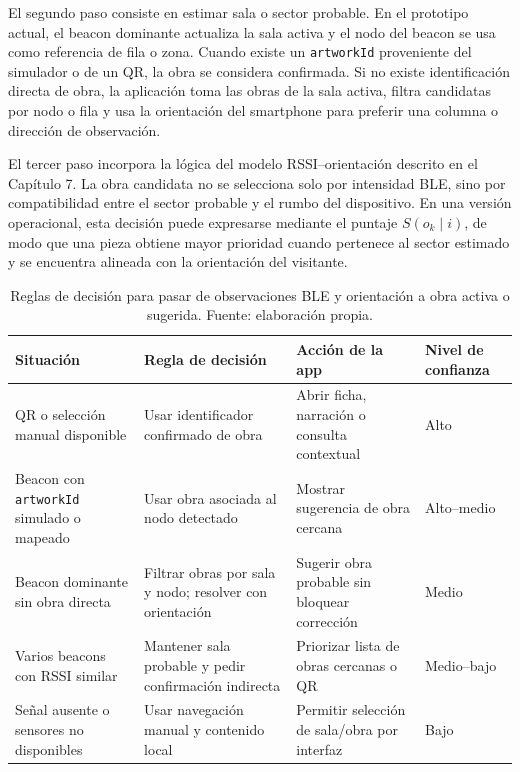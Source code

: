 El segundo paso consiste en estimar sala o sector probable. En el prototipo actual, el beacon dominante actualiza la sala activa y el nodo del beacon se usa como referencia de fila o zona. Cuando existe un \texttt{artworkId} proveniente del simulador o de un QR, la obra se considera confirmada. Si no existe identificaci\'on directa de obra, la aplicaci\'on toma las obras de la sala activa, filtra candidatas por nodo o fila y usa la orientaci\'on del smartphone para preferir una columna o direcci\'on de observaci\'on.

El tercer paso incorpora la l\'ogica del modelo RSSI--orientaci\'on descrito en el Cap\'itulo 7. La obra candidata no se selecciona solo por intensidad BLE, sino por compatibilidad entre el sector probable y el rumbo del dispositivo. En una versi\'on operacional, esta decisi\'on puede expresarse mediante el puntaje \(S(o_k \mid i)\), de modo que una pieza obtiene mayor prioridad cuando pertenece al sector estimado y se encuentra alineada con la orientaci\'on del visitante.

\begin{table}[h!]
    \centering
    \footnotesize
    \setlength{\tabcolsep}{4pt}
    \begin{tabular}{>{\raggedright\arraybackslash}p{3.2cm} >{\raggedright\arraybackslash}p{4.5cm} >{\raggedright\arraybackslash}p{4.2cm} >{\raggedright\arraybackslash}p{3.2cm}}
        \hline
        \textbf{Situaci\'on} & \textbf{Regla de decisi\'on} & \textbf{Acci\'on de la app} & \textbf{Nivel de confianza} \\
        \hline
        QR o selecci\'on manual disponible & Usar identificador confirmado de obra & Abrir ficha, narraci\'on o consulta contextual & Alto \\
        Beacon con \texttt{artworkId} simulado o mapeado & Usar obra asociada al nodo detectado & Mostrar sugerencia de obra cercana & Alto--medio \\
        Beacon dominante sin obra directa & Filtrar obras por sala y nodo; resolver con orientaci\'on & Sugerir obra probable sin bloquear correcci\'on & Medio \\
        Varios beacons con RSSI similar & Mantener sala probable y pedir confirmaci\'on indirecta & Priorizar lista de obras cercanas o QR & Medio--bajo \\
        Se\~nal ausente o sensores no disponibles & Usar navegaci\'on manual y contenido local & Permitir selecci\'on de sala/obra por interfaz & Bajo \\
        \hline
    \end{tabular}
    \caption[Reglas de decisi\'on para obra activa]{Reglas de decisi\'on para pasar de observaciones BLE y orientaci\'on a obra activa o sugerida. Fuente: elaboraci\'on propia.}
    \label{tab:reglas-obra-activa}
\end{table}

